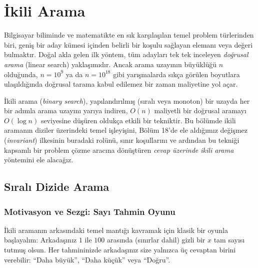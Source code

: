 \chapter[İkili Arama · \textit{Temel}]{İkili Arama}

Bilgisayar biliminde ve matematikte en sık karşılaşılan temel problem türlerinden biri, geniş bir aday kümesi içinden belirli bir koşulu sağlayan elemanı veya değeri bulmaktır. Doğal akla gelen ilk yöntem, tüm adayları tek tek inceleyen \emph{doğrusal arama} (linear search) yaklaşımıdır. Ancak arama uzayının büyüklüğü $n$ olduğunda, $n = 10^9$ ya da $n = 10^{18}$ gibi yarışmalarda sıkça görülen boyutlara ulaşıldığında doğrusal tarama kabul edilemez bir zaman maliyetine yol açar.

İkili arama (\emph{binary search}), yapılandırılmış (sıralı veya monoton) bir uzayda her bir adımla arama uzayını yarıya indiren, $O(n)$ maliyetli bir doğrusal aramayı $O(\log n)$ seviyesine düşüren oldukça etkili bir tekniktir. Bu bölümde ikili aramanın diziler üzerindeki temel işleyişini, Bölüm 18'de ele aldığımız değişmez (\emph{invariant}) ilkesinin buradaki rolünü, sınır koşullarını ve ardından bu tekniği kapsamlı bir problem çözme aracına dönüştüren \emph{cevap üzerinde ikili arama} yöntemini ele alacağız.

\section{Sıralı Dizide Arama}

\subsection{Motivasyon ve Sezgi: Sayı Tahmin Oyunu}

İkili aramanın arkasındaki temel mantığı kavramak için klasik bir oyunla başlayalım: Arkadaşınız $1$ ile $100$ arasında (sınırlar dahil) gizli bir $x$ tam sayısı tutmuş olsun. Her tahmininizde arkadaşınız size yalnızca üç cevaptan birini verebilir: ``Daha büyük'', ``Daha küçük'' veya ``Doğru''.

